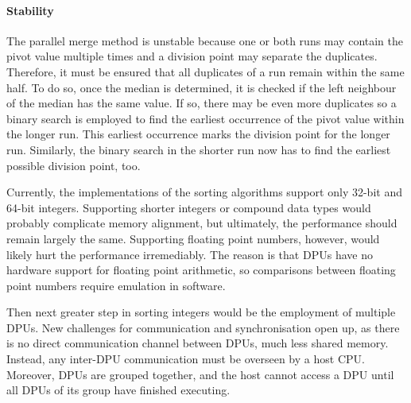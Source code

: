 \paragraph{Stability}
The parallel merge method is unstable because one or both runs may contain the pivot value multiple times and a division point may separate the duplicates.
Therefore, it must be ensured that all duplicates of a run remain within the same half.
To do so, once the median is determined, it is checked if the left neighbour of the median has the same value.
If so, there may be even more duplicates so a binary search is employed to find the earliest occurrence of the pivot value within the longer run.
This earliest occurrence marks the division point for the longer run.
Similarly, the binary search in the shorter run now has to find the earliest possible division point, too.

\bigskip

Currently, the implementations of the sorting algorithms support only 32-bit and 64-bit integers.
Supporting shorter integers or compound data types would probably complicate memory alignment, but ultimately, the performance should remain largely the same.
Supporting floating point numbers, however, would likely hurt the performance irremediably.
The reason is that \acp{DPU} have no hardware support for floating point arithmetic, so comparisons between floating point numbers require emulation in software.

Then next greater step in sorting integers would be the employment of multiple \acp{DPU}.
New challenges for communication and synchronisation open up, as there is no direct communication channel between \acp{DPU}, much less shared memory.
Instead, any inter-\acs{DPU} communication must be overseen by a host \ac{CPU}.
Moreover, \acp{DPU} are grouped together, and the host cannot access a \ac{DPU} until all \acp{DPU} of its group have finished executing.
